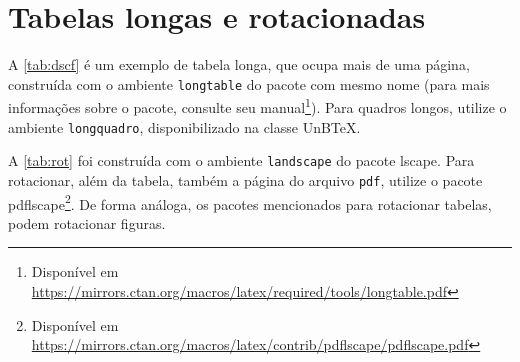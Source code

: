 \chapter{Tabelas longas e rotacionadas}\label{apd:tabs}

A \cref{tab:dscf} é um exemplo de tabela longa, que ocupa mais de uma página, construída com o ambiente \texttt{longtable} do pacote com mesmo nome (para mais informações sobre o pacote, consulte seu manual\footnote{Disponível em \url{https://mirrors.ctan.org/macros/latex/required/tools/longtable.pdf}}). Para quadros longos, utilize o ambiente \texttt{longquadro}, disponibilizado na classe UnB\TeX. 

A \cref{tab:rot} foi construída com o ambiente \texttt{landscape} do pacote \textsf{lscape}. Para rotacionar, além da tabela, também a página do arquivo \texttt{pdf}, utilize o pacote \textsf{pdflscape}\footnote{Disponível em \url{https://mirrors.ctan.org/macros/latex/contrib/pdflscape/pdflscape.pdf}}. De forma análoga, os pacotes mencionados para rotacionar tabelas, podem rotacionar figuras.

